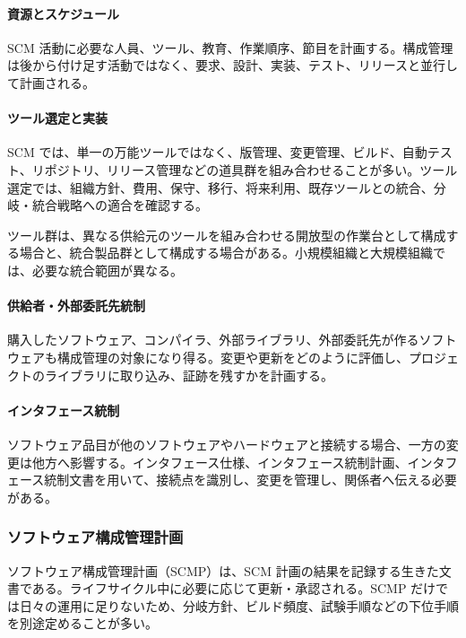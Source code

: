 \documentclass[a4paper,11pt]{ltjsarticle}
\numberwithin{figure}{section}
\numberwithin{table}{section}
\begin{document}
\paragraph*{資源とスケジュール}
SCM 活動に必要な人員、ツール、教育、作業順序、節目を計画する。構成管理は後から付け足す活動ではなく、要求、設計、実装、テスト、リリースと並行して計画される。

\paragraph*{ツール選定と実装}
SCM では、単一の万能ツールではなく、版管理、変更管理、ビルド、自動テスト、リポジトリ、リリース管理などの道具群を組み合わせることが多い。ツール選定では、組織方針、費用、保守、移行、将来利用、既存ツールとの統合、分岐・統合戦略への適合を確認する。

ツール群は、異なる供給元のツールを組み合わせる開放型の作業台として構成する場合と、統合製品群として構成する場合がある。小規模組織と大規模組織では、必要な統合範囲が異なる。

\paragraph*{供給者・外部委託先統制}
購入したソフトウェア、コンパイラ、外部ライブラリ、外部委託先が作るソフトウェアも構成管理の対象になり得る。変更や更新をどのように評価し、プロジェクトのライブラリに取り込み、証跡を残すかを計画する。

\paragraph*{インタフェース統制}
ソフトウェア品目が他のソフトウェアやハードウェアと接続する場合、一方の変更は他方へ影響する。インタフェース仕様、インタフェース統制計画、インタフェース統制文書を用いて、接続点を識別し、変更を管理し、関係者へ伝える必要がある。

\subsubsection*{ソフトウェア構成管理計画}
ソフトウェア構成管理計画（SCMP）は、SCM 計画の結果を記録する生きた文書である。ライフサイクル中に必要に応じて更新・承認される。SCMP だけでは日々の運用に足りないため、分岐方針、ビルド頻度、試験手順などの下位手順を別途定めることが多い。
\end{document}

